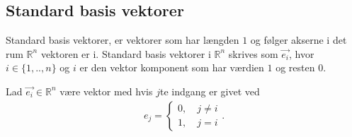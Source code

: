 \subsection{Standard basis vektorer}
Standard basis vektorer, er vektorer som har længden $1$ og følger akserne i det rum $\mathds{R}^n$ vektoren er i.
Standard basis vektorer i $\mathds{R}^n$ skrives som $\vec{e_i}$, hvor $i\in \{1,..,n\}$ og $i$ er den vektor komponent som har værdien $1$ og resten $0$.

\begin{defn}
Lad $\vec{e_i}\in\mathds{R}^n$ være vektor med hvis $j$te indgang er givet ved
\begin{align*}
e_j=\begin{cases} 0, \quad j \neq i
\\ 1 , \quad j = i \end{cases}.
\end{align*}

\end{defn}